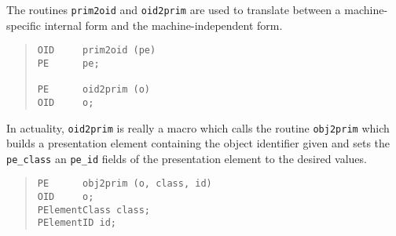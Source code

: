 The routines \verb"prim2oid" and \verb"oid2prim" are used to translate
between a machine-specific internal form and the machine-independent form.
\begin{quote}\small\begin{verbatim}
OID     prim2oid (pe)
PE      pe;

PE      oid2prim (o)
OID     o;
\end{verbatim}\end{quote}
In actuality,
\verb"oid2prim" is really a macro which calls the routine \verb"obj2prim"
which builds a presentation element containing the object identifier given
and sets the \verb"pe_class" an \verb"pe_id" fields of the presentation element
to the desired values.
\begin{quote}\small\begin{verbatim}
PE      obj2prim (o, class, id)
OID     o;
PElementClass class;
PElementID id;
\end{verbatim}\end{quote}

